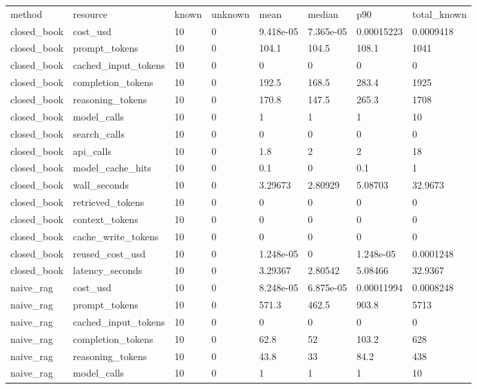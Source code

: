 \begin{tabular}{llllllll}
\hline
method & resource & known & unknown & mean & median & p90 & total\_known \\
closed\_book & cost\_usd & 10 & 0 & 9.418e-05 & 7.365e-05 & 0.00015223 & 0.0009418 \\
closed\_book & prompt\_tokens & 10 & 0 & 104.1 & 104.5 & 108.1 & 1041 \\
closed\_book & cached\_input\_tokens & 10 & 0 & 0 & 0 & 0 & 0 \\
closed\_book & completion\_tokens & 10 & 0 & 192.5 & 168.5 & 283.4 & 1925 \\
closed\_book & reasoning\_tokens & 10 & 0 & 170.8 & 147.5 & 265.3 & 1708 \\
closed\_book & model\_calls & 10 & 0 & 1 & 1 & 1 & 10 \\
closed\_book & search\_calls & 10 & 0 & 0 & 0 & 0 & 0 \\
closed\_book & api\_calls & 10 & 0 & 1.8 & 2 & 2 & 18 \\
closed\_book & model\_cache\_hits & 10 & 0 & 0.1 & 0 & 0.1 & 1 \\
closed\_book & wall\_seconds & 10 & 0 & 3.29673 & 2.80929 & 5.08703 & 32.9673 \\
closed\_book & retrieved\_tokens & 10 & 0 & 0 & 0 & 0 & 0 \\
closed\_book & context\_tokens & 10 & 0 & 0 & 0 & 0 & 0 \\
closed\_book & cache\_write\_tokens & 10 & 0 & 0 & 0 & 0 & 0 \\
closed\_book & reused\_cost\_usd & 10 & 0 & 1.248e-05 & 0 & 1.248e-05 & 0.0001248 \\
closed\_book & latency\_seconds & 10 & 0 & 3.29367 & 2.80542 & 5.08466 & 32.9367 \\
naive\_rag & cost\_usd & 10 & 0 & 8.248e-05 & 6.875e-05 & 0.00011994 & 0.0008248 \\
naive\_rag & prompt\_tokens & 10 & 0 & 571.3 & 462.5 & 903.8 & 5713 \\
naive\_rag & cached\_input\_tokens & 10 & 0 & 0 & 0 & 0 & 0 \\
naive\_rag & completion\_tokens & 10 & 0 & 62.8 & 52 & 103.2 & 628 \\
naive\_rag & reasoning\_tokens & 10 & 0 & 43.8 & 33 & 84.2 & 438 \\
naive\_rag & model\_calls & 10 & 0 & 1 & 1 & 1 & 10 \\

\end{tabular}
